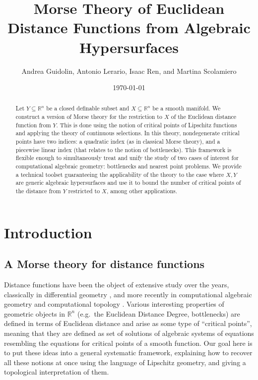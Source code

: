 \documentclass{amsart}
\title[Morse Theory of Euclidean Distance Functions from Algebraic Hypersurfaces]{Morse Theory of Euclidean Distance Functions from Algebraic Hypersurfaces}
\author{Andrea Guidolin, Antonio Lerario, Isaac Ren, and Martina Scolamiero}
\date{\today}%
\newcommand{\R}{\mathbb{R}}
\theoremstyle{definition}
\theoremstyle{remark}
\begin{document}
\begin{abstract}
Let $Y\subseteq \R^n$ be a closed definable subset and $X\subseteq \R^n$ be a smooth manifold. We construct a version of Morse theory for the restriction to $X$ of the Euclidean distance function from $Y$. This is done using the notion of critical points of Lipschitz functions and applying the theory of continuous selections. In this theory, nondegenerate critical points have two indices: a quadratic index (as in classical Morse theory), and a piecewise linear index (that relates to the notion of bottlenecks).
This framework is flexible enough to simultaneously treat and unify the study of two cases of interest for computational algebraic geometry: bottlenecks and nearest point problems.
We provide a technical toolset guaranteeing the applicability of the theory to the case where $X, Y$ are generic algebraic hypersurfaces and use it to bound the number of critical points of the distance from $Y$ restricted to $X$, among other applications.
\end{abstract}

\maketitle

\section{Introduction}

\subsection{A Morse theory for distance functions}
Distance functions have been the object of extensive study over the years, classically in differential geometry \cite{Looijenga1974,Wall1977,Grove_annals,Yomdin1981,cheeger,BrockerKupper2000,Rifford2004,CohenSteinerCommaret2024}, and more recently in computational algebraic geometry  \cite{Ottaviani2018TheDF,DiRocco_Eklund_Weinstein,DEEGH2023,BSK} and computational topology \cite{Chazal_Lieutier,bobrowski2014distance,oudot2017persistence,song2023generalized,ACSD2023}.
Various interesting properties of geometric objects in $\R^n$ (e.g.\ the Euclidean Distance Degree, bottlenecks) are defined in terms of Euclidean distance and arise as some type of ``critical points'', meaning that they are defined as set of solutions of algebraic systems of equations resembling the equations for critical points of a smooth function.
Our goal here is to put these ideas  into a general systematic framework, explaining how to recover all these notions at once using the language of Lipschitz geometry, and giving  a topological interpretation of them. 
\end{document}
